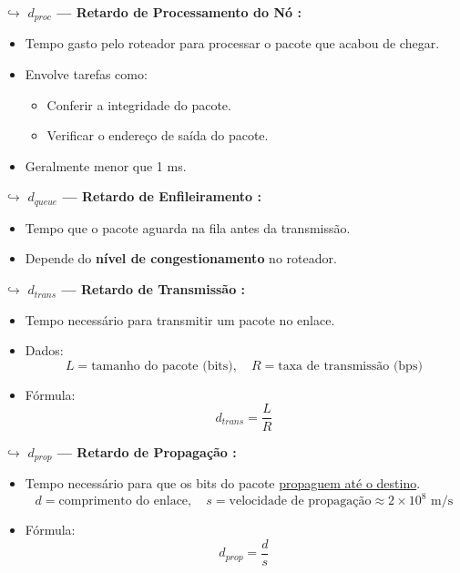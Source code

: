 \begin{itemize}
            $\hookrightarrow$ \textbf{$d_{proc}$ — Retardo de Processamento do Nó :}
            \begin{itemize}
                \item Tempo gasto pelo roteador para processar o pacote que acabou de chegar.
                \item Envolve tarefas como:
                \begin{itemize}
                    \item Conferir a integridade do pacote.
                    \item Verificar o endereço de saída do pacote.
                \end{itemize}
                \item Geralmente menor que 1 ms.
            \end{itemize}

            $\hookrightarrow$ \textbf{$d_{queue}$ — Retardo de Enfileiramento :}
            \begin{itemize}
                \item Tempo que o pacote aguarda na fila antes da transmissão.
                \item Depende do \textbf{nível de congestionamento} no roteador.
            \end{itemize}

            $\hookrightarrow$ \textbf{$d_{trans}$ — Retardo de Transmissão :}
            \begin{itemize}
                \item Tempo necessário para transmitir um pacote no enlace.
                \item Dados:
                \[
                L = \text{tamanho do pacote (bits)}, \quad R = \text{taxa de transmissão (bps)}
                \]
                \item Fórmula:
                \[
                d_{trans} = \frac{L}{R}
                \]
            \end{itemize}

            $\hookrightarrow$ \textbf{$d_{prop}$ — Retardo de Propagação :}
            \begin{itemize}
                \item Tempo necessário para que os bits do pacote \underline{propaguem até o destino}.
                \[
                d = \text{comprimento do enlace}, \quad s = \text{velocidade de propagação} \approx 2 \times 10^8 \text{ m/s}
                \]
                \item Fórmula:
                \[
                d_{prop} = \frac{d}{s}
                \]
            \end{itemize}
        

\end{itemize}
